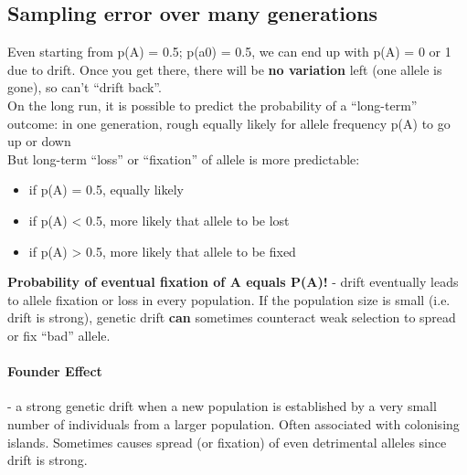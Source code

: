 \documentclass{scrartcl}
\begin{document}
\subsection{Sampling error over many generations}
\label{sec:07-05}
Even starting from p(A) = 0.5; p(a0) = 0.5, we can end up with p(A) = 0 or 1 due to drift.
Once you get there, there will be {\bf no variation} left (one allele is gone), so can't ``drift back''.\\
On the long run, it is possible to predict the probability of a ``long-term'' outcome: in one generation, rough equally likely for allele frequency p(A) to go up or down\\
But long-term ``loss'' or ``fixation'' of allele is more predictable:
\begin{itemize}
\item if p(A) = 0.5, equally likely
\item if p(A) < 0.5, more likely that allele to be lost
\item if p(A) > 0.5, more likely that allele to be fixed
\end{itemize}
{\bf Probability of eventual fixation of A equals P(A)!} - drift eventually leads to allele fixation or loss in every population.
If the population size is small (i.e. drift is strong), genetic drift {\bf can} sometimes counteract weak selection to spread or fix ``bad'' allele.

\paragraph{Founder Effect}
- a strong genetic drift when a new population is established by a very small number of individuals from a larger population.
Often associated with colonising islands.
Sometimes causes spread (or fixation) of even detrimental alleles since drift is strong.

\end{document}
